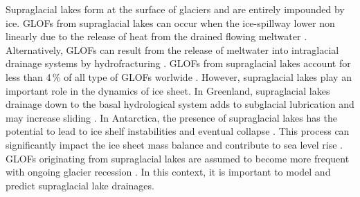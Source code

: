 Supraglacial lakes form at the surface of glaciers and are entirely impounded by ice. GLOFs from supraglacial lakes can occur when the ice-spillway lower non linearly due to the release of heat from the drained flowing meltwater \citep{RaymondNolan2000}. Alternatively, GLOFs can result from the release of meltwater into intraglacial drainage systems by hydrofracturing \citep[e.g.][]{Bjornsson1976, Boon&Sharp2003}. GLOFs from supraglacial lakes account for less than 4\,\% of all type of GLOFs worlwide \citep{Lutzow&al2023}. However, supraglacial lakes play an important role in the dynamics of ice sheet. In Greenland, supraglacial lakes drainage down to the basal hydrological
system adds to subglacial lubrication and may increase sliding \citep[e.g.][]{Schoof2010,Pimentel&Flowers2011,Tedesco&al2013}. In Antarctica, the presence of supraglacial lakes has the potential to lead to ice shelf instabilities and eventual collapse \citep[e.g.][]{Banwell&al2013,Banwell&al2019}. This process can significantly impact the ice sheet mass balance and contribute to sea level rise \citep{Van&al2022}. GLOFs originating from supraglacial lakes are assumed to become more frequent with ongoing glacier recession \cite{Emmer&al2022,Miles&al2018}. In this context, it is important to model and predict supraglacial lake drainages. 

